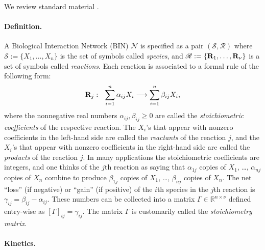 \documentclass[onefignum,onetabnum]{siamonline220329}
\newcommand{\R}{{\rm \bf R}}
\begin{document}
We review standard material \cite{feinberg87,erdi89,sontag01,MA_LEARN}.
 
\paragraph{Definition.} 

A Biological Interaction Network (BIN) 
$\mathscr N$ is specified as a pair $(\mathscr S,\mathscr R)$  where $\mathscr S:=\{X_1,\dots,X_n\}$ is the set of symbols called \textit{species}, and $\mathscr R:=\{\R_1,\dots,\R_\nu\}$ is a set of symbols called \textit{reactions}. Each reaction is associated to a formal rule of the following form:
 \[\R_j:~~ \sum_{i=1}^n {\alpha_{ij}}X_i \longrightarrow \sum_{i=1}^n \beta_{ij} X_i, \]
 where the nonnegative real numbers $\alpha_{ij},\beta_{ij}\ge 0$ are called the \textit{stoichiometric coefficients} of the respective reaction. 
 The $X_i$'s that appear with nonzero coefficients in the left-hand side are called the \textit{reactants} of the reaction $j$, and the $X_i$'s that appear with nonzero coefficients in the right-hand side are called the \textit{products} of the reaction $j$.
 In many applications the stoichiometric coefficients are integers, and one thinks of {the {$j$}th} reaction as saying that $\alpha_{{1j}}$ copies of $X_1$, \ldots,
 $\alpha_{{nj}}$ copies of $X_n$ combine to produce
 $\beta_{{1j}}$ copies of $X_1$, \ldots,
 $\beta_{{nj}}$ copies of $X_n$.
 The net ``loss'' (if negative) or ``gain'' (if positive) of the $i$th species in the $j$th reaction is  $\gamma_{ij}=\beta_{ij}-\alpha_{ij}$. These numbers can be collected into a matrix $\Gamma \in\mathbb R^{n\times \nu}$ defined entry-wise as $[\Gamma]_{ij}= \gamma_{ij}$.  The matrix $\Gamma$ is customarily called the \textit{stoichiometry matrix}.
 
 \paragraph{Kinetics.} 
 
\end{document}
